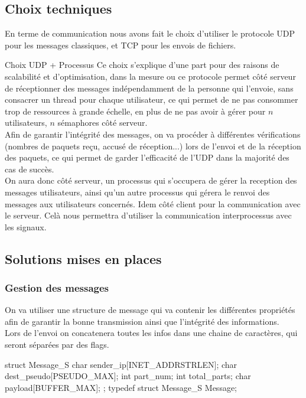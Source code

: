 \documentclass{cs-moi}
\begin{document}
\subsection{Choix techniques}
En terme de communication nous avons fait le choix d'utiliser le protocole UDP pour les messages classiques, et TCP pour les envois de fichiers.

\begin{remarque}{Choix UDP + Processus}
     Ce choix s'explique d'une part pour des raisons de scalabilité et d'optimisation, dans la mesure ou ce protocole permet côté serveur de réceptionner des messages indépendamment de la personne qui l'envoie, sans consacrer un thread pour chaque utilisateur, ce qui permet de ne pas consommer trop de ressources à grande échelle, en plus de ne pas avoir à gérer pour $n$ utilisateurs, $n$ sémaphores côté serveur.\\
     Afin de garantir l'intégrité des messages, on va procéder à différentes vérifications (nombres de paquets reçu, accusé de réception...) lors de l'envoi et de la réception des paquets, ce qui permet de garder l'efficacité de l'UDP dans la majorité des cas de succès.\\
     On aura donc côté serveur, un processus qui s'occupera de gérer la reception des messages utilisateurs, ainsi qu'un autre processus qui gérera le renvoi des messages aux utilisateurs concernés. Idem côté client pour la communication avec le serveur. Celà nous permettra d'utiliser la communication interprocessus avec les signaux.
\end{remarque} 

\subsection{Solutions mises en places}
\subsubsection{Gestion des messages}
On va utiliser une structure de message qui va contenir les différentes propriétés afin de garantir la bonne transmission ainsi que l'intégrité des informations.\\
Lors de l'envoi on concatenera toutes les infos dans une chaine de caractères, qui seront séparées par des flags.

\begin{C}
    struct Message_S {
        char sender_ip[INET_ADDRSTRLEN];
        char dest_pseudo[PSEUDO_MAX];
        int  part_num;
        int  total_parts;
        char payload[BUFFER_MAX];
    };
    typedef struct Message_S Message;
\end{C}
\end{document}
